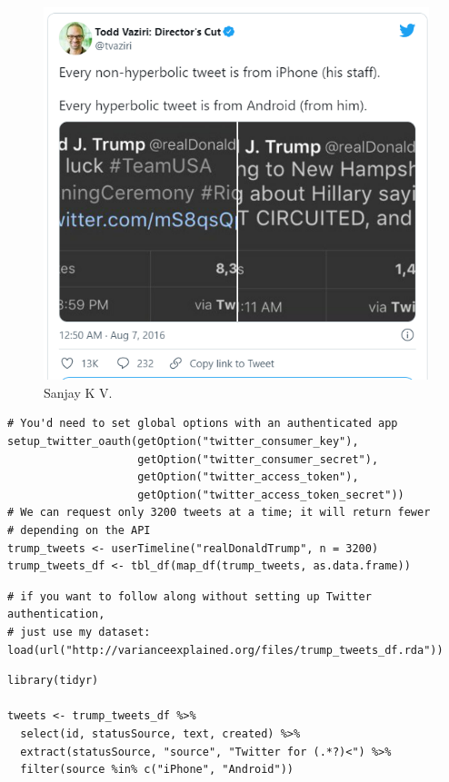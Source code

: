 \documentclass[a4paper,12pt]{article}
\begin{document}
  \begin{figure}[h!]
  \includegraphics[width=\linewidth]{Tweet.png}
  \caption{Sanjay K V.}
  \label{fig:Tweet by Todd Vaziri}
\end{figure}



\begin{lstlisting}
# You'd need to set global options with an authenticated app
setup_twitter_oauth(getOption("twitter_consumer_key"),
                    getOption("twitter_consumer_secret"),
                    getOption("twitter_access_token"),
                    getOption("twitter_access_token_secret"))
# We can request only 3200 tweets at a time; it will return fewer
# depending on the API
trump_tweets <- userTimeline("realDonaldTrump", n = 3200)
trump_tweets_df <- tbl_df(map_df(trump_tweets, as.data.frame))
\end{lstlisting}

\begin{lstlisting}
# if you want to follow along without setting up Twitter authentication,
# just use my dataset:
load(url("http://varianceexplained.org/files/trump_tweets_df.rda"))
\end{lstlisting}
\printbibliography

\begin{lstlisting}
library(tidyr)

tweets <- trump_tweets_df %>%
  select(id, statusSource, text, created) %>%
  extract(statusSource, "source", "Twitter for (.*?)<") %>%
  filter(source %in% c("iPhone", "Android"))
  \end{lstlisting}
  
\end{document}
